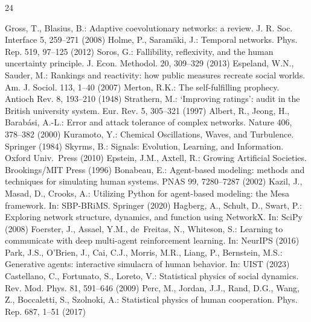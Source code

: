 \documentclass{svproc}
\begin{document}
\begingroup\small
\begin{thebibliography}{24}
\setlength{\itemsep}{-1.5pt}
\setlength{\parsep}{0pt}
\setlength{\itemindent}{0pt}

 Gross, T., Blasius, B.: Adaptive coevolutionary
networks: a review. J. R. Soc. Interface 5, 259--271 (2008)
 Holme, P., Saram\"aki, J.: Temporal networks.
Phys. Rep. 519, 97--125 (2012)
 Soros, G.: Fallibility, reflexivity, and the
human uncertainty principle. J. Econ. Methodol. 20, 309--329 (2013)
 Espeland, W.N., Sauder, M.: Rankings and
reactivity: how public measures recreate social worlds. Am. J. Sociol. 113, 1--40 (2007)
 Merton, R.K.: The self-fulfilling prophecy. Antioch Rev. 8, 193--210 (1948)
 Strathern, M.: `Improving ratings': audit in
the British university system. Eur. Rev. 5, 305--321 (1997)
 Albert, R., Jeong, H., Barab\'asi, A.-L.: Error and
attack tolerance of complex networks. Nature 406, 378--382 (2000)
 Kuramoto, Y.: Chemical Oscillations, Waves,
and Turbulence. Springer (1984)
 Skyrms, B.: Signals: Evolution, Learning, and Information. Oxford Univ.\ Press (2010)
 Epstein, J.M., Axtell, R.: Growing Artificial Societies. Brookings/MIT Press (1996)
 Bonabeau, E.: Agent-based modeling: methods and
techniques for simulating human systems. PNAS 99, 7280--7287 (2002)
 Kazil, J., Masad, D., Crooks, A.: Utilizing Python
for agent-based modeling: the Mesa framework. In: SBP-BRiMS. Springer (2020)
 Hagberg, A., Schult, D., Swart, P.: Exploring
network structure, dynamics, and function using NetworkX. In: SciPy (2008)
 Foerster, J., Assael, Y.M., de~Freitas, N.,
Whiteson, S.: Learning to communicate with deep multi-agent reinforcement
learning. In: NeurIPS (2016)
 Park, J.S., O'Brien, J., Cai, C.J., Morris,
M.R., Liang, P., Bernstein, M.S.: Generative agents: interactive simulacra of
human behavior. In: UIST (2023)
 Castellano, C., Fortunato, S., Loreto, V.: Statistical physics of social dynamics. Rev. Mod. Phys. 81, 591--646 (2009)
 Perc, M., Jordan, J.J., Rand, D.G., Wang, Z.,
Boccaletti, S., Szolnoki, A.: Statistical physics of human cooperation. Phys.
Rep. 687, 1--51 (2017)

\end{thebibliography}
\end{document}
